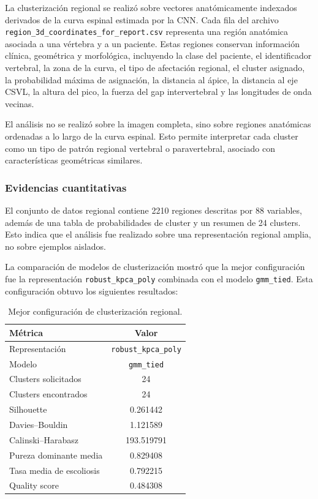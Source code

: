 \documentclass[conference]{IEEEtran}
\begin{document}
La clusterización regional se realizó sobre vectores anatómicamente indexados derivados de la curva espinal estimada por la CNN. Cada fila del archivo \texttt{region\_3d\_coordinates\_for\_report.csv} representa una región anatómica asociada a una vértebra y a un paciente. Estas regiones conservan información clínica, geométrica y morfológica, incluyendo la clase del paciente, el identificador vertebral, la zona de la curva, el tipo de afectación regional, el cluster asignado, la probabilidad máxima de asignación, la distancia al ápice, la distancia al eje CSVL, la altura del pico, la fuerza del gap intervertebral y las longitudes de onda vecinas.

El análisis no se realizó sobre la imagen completa, sino sobre regiones anatómicas ordenadas a lo largo de la curva espinal. Esto permite interpretar cada cluster como un tipo de patrón regional vertebral o paravertebral, asociado con características geométricas similares.

\subsubsection{Evidencias cuantitativas}

El conjunto de datos regional contiene 2210 regiones descritas por 88 variables, además de una tabla de probabilidades de cluster y un resumen de 24 clusters. Esto indica que el análisis fue realizado sobre una representación regional amplia, no sobre ejemplos aislados.

La comparación de modelos de clusterización mostró que la mejor configuración fue la representación \texttt{robust\_kpca\_poly} combinada con el modelo \texttt{gmm\_tied}. Esta configuración obtuvo los siguientes resultados:

\begin{table}[H]
\centering
\caption{Mejor configuración de clusterización regional.}
\label{tab:best_clustering_model}
\begin{tabular}{lc}
\hline
\textbf{Métrica} & \textbf{Valor} \\
\hline
Representación & \texttt{robust\_kpca\_poly} \\
Modelo & \texttt{gmm\_tied} \\
Clusters solicitados & 24 \\
Clusters encontrados & 24 \\
Silhouette & 0.261442 \\
Davies--Bouldin & 1.121589 \\
Calinski--Harabasz & 193.519791 \\
Pureza dominante media & 0.829408 \\
Tasa media de escoliosis & 0.792215 \\
Quality score & 0.484308 \\
\hline
\end{tabular}
\end{table}
\end{document}
